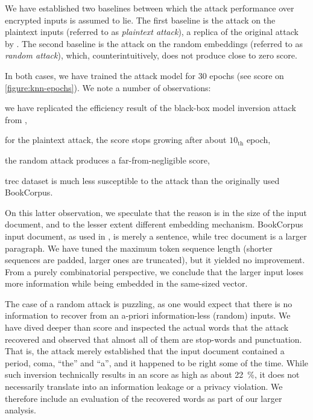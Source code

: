 				

				We have established two baselines between which the attack performance over encrypted inputs is assumed to lie.
				The first baseline is the attack on the plaintext inputs (referred to as \emph{plaintext attack}), a replica of the original attack by \textcite{embedding-attacks}.
				The second baseline is the attack on the random embeddings (referred to as \emph{random attack}), which, counterintuitively, does not produce close to zero \FOne{} score.

				In both cases, we have trained the attack model for 30 epochs (see \FOne{} score on \cref{figure:knn-epochs}).
				We note a number of observations:
				\begin{enumerate*}[label={(\roman*)}]
					\item we have replicated the efficiency result of the black-box model inversion attack from \cite[Table 2, \FOne{} score, same domain, $\mathcal{L}_{\text{\acrshort{msp}}}$, \acrshort{bert}]{embedding-attacks},
					\item for the plaintext attack, the \FOne{} score stops growing after about $10_\text{th}$ epoch,
					\item the random attack produces a far-from-negligible \FOne{} score,
					\item \acrshort{trec} dataset is much less susceptible to the attack than the originally used BookCorpus.
				\end{enumerate*}

				On this latter observation, we speculate that the reason is in the size of the input document, and to the lesser extent different embedding mechanism.
				BookCorpus input document, as used in \cite{embedding-attacks}, is merely a sentence, while \acrshort{trec} document is a larger paragraph.
				We have tuned the maximum token sequence length (shorter sequences are padded, larger ones are truncated), but it yielded no improvement.
				From a purely combinatorial perspective, we conclude that the larger input loses more information while being embedded in the same-sized vector.

				The case of a random attack is puzzling, as one would expect that there is no information to recover from an a-priori information-less (random) inputs.
				We have dived deeper than \FOne{} score and inspected the actual words that the attack recovered and observed that almost all of them are stop-words and punctuation.
				That is, the attack merely established that the input document contained a period, coma, ``the'' and ``a'', and it happened to be right some of the time.
				While such inversion technically results in an \FOne{} score as high as about \SI{22}{\percent}, it does not necessarily translate into an information leakage or a privacy violation.
				We therefore include an evaluation of the recovered words as part of our larger analysis.


